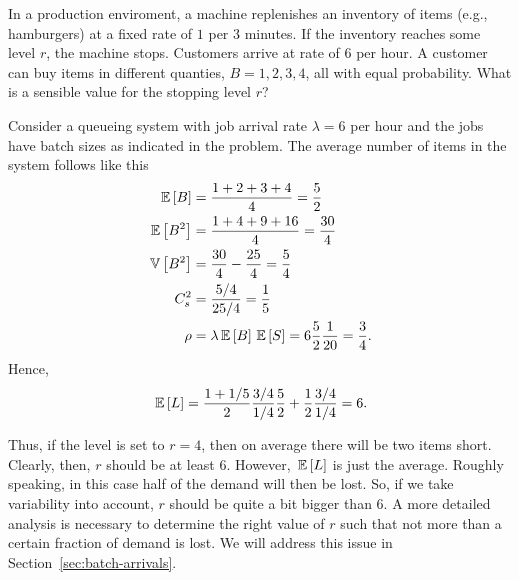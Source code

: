 \begin{question}
  In a production enviroment, a machine replenishes an inventory of
  items (e.g., hamburgers) at a fixed rate of $1$ per 3 minutes. If
  the inventory reaches some level $r$, the machine stops.  Customers
  arrive at rate of 6 per hour. A customer can buy items in different
  quanties, $B=1,2,3,4$, all with equal probability. What is a
  sensible value for the stopping level $r$?  

  \begin{solution}
    Consider a queueing system with job arrival rate $\lambda=6$ per
    hour and the jobs have batch sizes as indicated in the
    problem. The average number of items in the system  follows like this
    \begin{align*}
      \,\mathbb{E}\left[B\right] &= \frac{1+2+3+4}{4} = \frac 52 \\
      \,\mathbb{E}\left[B^2\right] &= \frac{1+4+9+16}{4} = \frac{30}4\\
      \,\mathbb{V}\left[B^2\right] &= \frac{30}4 - \frac{25}4 = \frac 5 4\\
      C_s^2 &= \frac{5/4}{25/4} = \frac 15\\
      \rho &= \lambda \,\mathbb{E}\left[B\right] \,\mathbb{E}\left[S\right] = 6 \frac 52 \frac 1{20} = \frac 34.
    \end{align*}
Hence, 
\begin{equation*}
  \,\mathbb{E}\left[L\right] = \frac {1+1/5}2 \frac{3/4}{1/4} \frac 52 + \frac 12 \frac{3/4}{1/4} = 6.
\end{equation*}

Thus, if the level is set to $r=4$, then on average there will be two
items short. Clearly, then, $r$ should be at least $6$. However,
$\,\mathbb{E}\left[L\right]$ is just the average. Roughly speaking, in this case half of
the demand will then be lost. So, if we take variability into account,
$r$ should be quite a bit bigger than 6. A more detailed analysis is
necessary to determine the right value of $r$ such that not more than
a certain fraction of demand is lost. We will address this issue in
Section~\ref{sec:batch-arrivals}.

    
  \end{solution}
\end{question}



